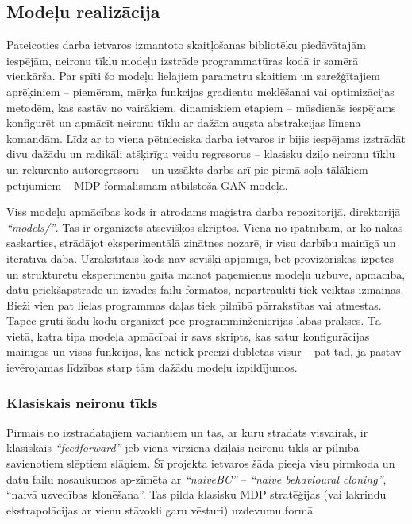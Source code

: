 \documentclass[12pt, a4paper]{article}
\numberwithin{equation}{section} %
\begin{document}
\subsection{Modeļu realizācija}

Pateicoties darba ietvaros izmantoto skaitļošanas bibliotēku piedāvātajām iespējām, neironu tīkļu modeļu izstrāde programmatūras kodā ir samērā vienkārša. Par spīti šo modeļu lielajiem parametru skaitiem un sarežģītajiem aprēķiniem -- piemēram, mērķa funkcijas gradientu meklēšanai vai optimizācijas metodēm, kas sastāv no vairākiem, dinamiskiem etapiem -- mūsdienās iespējams konfigurēt un apmācīt neironu tīklu ar dažām augsta abstrakcijas līmeņa komandām. Līdz ar to viena pētnieciska darba ietvaros ir bijis iespējams izstrādāt divu dažādu un radikāli atšķirīgu veidu regresorus -- klasisku dziļo neironu tīklu un rekurento autoregresoru -- un uzsākts darbs arī pie pirmā soļa tālākiem pētījumiem -- MDP formālismam atbilstoša GAN modeļa. 

Viss modeļu apmācības kods ir atrodams maģistra darba repozitorijā, direktorijā \textit{``models/''}. Tas ir organizēts atsevišķos skriptos. Viena no īpatnībām, ar ko nākas saskarties, strādājot eksperimentālā zinātnes nozarē, ir visu darbību mainīgā un iteratīvā daba. Uzrakstītais kods nav sevišķi apjomīgs, bet provizoriskas izpētes un strukturētu eksperimentu gaitā mainot paņēmienus modeļu uzbūvē, apmācībā, datu priekšapstrādē un izvades failu formātos, nepārtraukti tiek veiktas izmaiņas. Bieži vien pat lielas programmas daļas tiek pilnībā pārrakstītas vai atmestas. Tāpēc grūti šādu kodu organizēt pēc programminženierijas labās prakses. Tā vietā, katra tipa modeļa apmācībai ir savs skripts, kas satur konfigurācijas mainīgos un visas funkcijas, kas netiek precīzi dublētas visur -- pat tad, ja pastāv ievērojamas līdzības starp tām dažādu modeļu izpildījumos. 

\subsubsection{Klasiskais neironu tīkls}

Pirmais no izstrādātajiem variantiem un tas, ar kuru strādāts visvairāk, ir klasiskais \textit{``feedforward''} jeb viena virziena dziļais neironu tīkls ar pilnībā savienotiem slēptiem slāņiem. Šī projekta ietvaros šāda pieeja visu pirmkoda un datu failu nosaukumos ap-zīmēta ar \textit{``naiveBC''} -- \textit{``naive behavioural cloning''}, ``naivā uzvedības klonēšana''. Tas pilda klasisku MDP stratēģijas (vai lakrindu ekstrapolācijas ar vienu stāvokli garu vēsturi) uzdevumu formā
\end{document}
